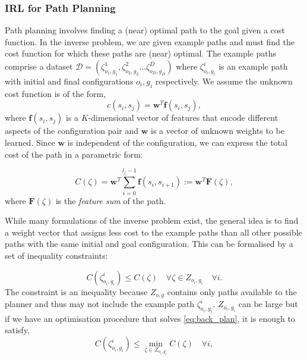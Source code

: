 \documentclass[a4paper,11pt]{report}
\begin{document}
\subsubsection{IRL for Path Planning \label{subsec:inverse_problem}}
Path planning involves finding a (near) optimal path to the goal given a cost function. In the inverse problem, we are given example paths and must find the cost function for which these paths are (near) optimal.  The example paths comprise a dataset $\mathcal{D} = (\zeta^1_{o_1,g_1},\zeta^2_{o_2,g_2}...\zeta^D_{o_D,g_D})$ where $\zeta^i_{o_i,g_i}$ is an example path with initial and final configurations $o_i,g_i$ respectively. We assume the unknown cost function is of the form,
\begin{equation}
	c(s_i,s_j) = \mathbf{w}^T \mathbf{f}(s_i,s_j), \label{eq:inner_prod}
\end{equation}
where $\mathbf{f}(s_i,s_j)$ is a $K$-dimensional vector of features that encode different aspects of the configuration pair and $\mathbf{w}$ is a vector of unknown weights to be learned. Since $\mathbf{w}$ is independent of the configuration, we can express the total cost of the path in a parametric form:

\begin{equation}
	C(\zeta) = \mathbf{w}^T\sum_{i=0}^{l_{\zeta}-1} \mathbf{f}(s_i,s_{i+1}) := \mathbf{w}^T \mathbf{F}(\zeta),
\end{equation}
where $\mathbf{F}(\zeta)$ is the \emph{feature sum} of the path.

While many formulations of the inverse problem exist, the general idea is to find a weight vector that assigns less cost to the example paths than all other possible paths with the same initial and goal configuration.  This can be formalised by a set of inequality constraints:

\begin{equation}
	C(\zeta^i_{o_i,g_i}) \leq  C(\zeta) \quad \forall \zeta \in Z_{o_i,g_i}  \quad \forall i. \label{eq:const1}
\end{equation}
The constraint is an inequality because $Z_{o,g}$ contains only paths available to the planner and thus may not include the example path $\zeta^i_{o_i,g_i}$.
$Z_{o_i,g_i}$ can be large but if we have an optimisation procedure that solves \eqref{eq:back_plan}, it is enough to satisfy, 
\begin{equation}
	C(\zeta^i_{o_i,g_i}) \leq \min_{\zeta \in Z_{o_i,g_i}} C(\zeta) \quad \forall i, \label{eq:const}
\end{equation}
\end{document}
